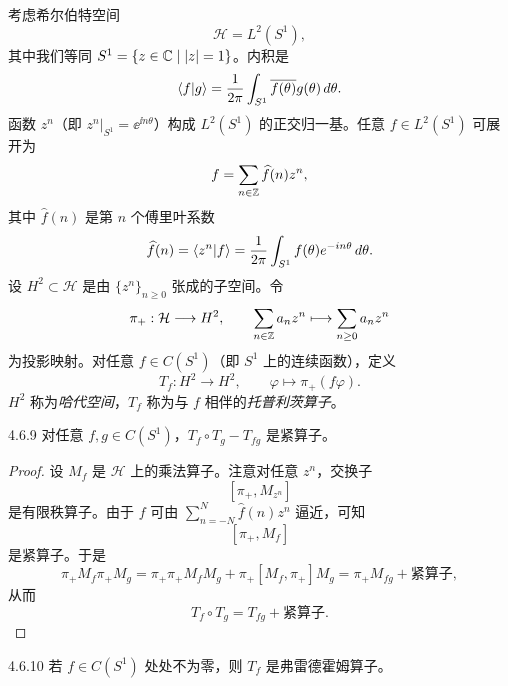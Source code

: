 考虑希尔伯特空间
\[
\mathcal{H}=L^2(S^1),
\]
其中我们等同 $S^1=\{z\in\mathbb{C}\mid\lvert z\rvert=1\}$。内积是
\[
\langle f|g\rangle=\frac{1}{2\pi}\int_{S^1}\overline{f(\theta)}g(\theta)\,d\theta.
\]
函数 $z^n$（即 $z^n|_{S^1}=\ee^{\ii n\theta}$）构成 $L^2(S^1)$ 的正交归一基。任意 $f\in L^2(S^1)$ 可展开为
\[
f=\sum_{n\in\mathbb{Z}}\widehat{f}(n)z^n,
\]
其中 $\widehat{f}(n)$ 是第 $n$ 个傅里叶系数
\[
\widehat{f}(n)=\langle z^n|f\rangle
=\frac{1}{2\pi}\int_{S^1}f(\theta)e^{-i n\theta}\,d\theta.
\]
设 $H^2\subset\mathcal{H}$ 是由 $\{z^n\}_{n\ge0}$ 张成的子空间。令
\[
\pi_+:\mathcal{H}\longrightarrow H^2,\qquad
\sum_{n\in\mathbb{Z}}a_nz^n\longmapsto\sum_{n\ge0}a_nz^n
\]
为投影映射。对任意 $f\in C(S^1)$（即 $S^1$ 上的连续函数），定义
\[
T_f:H^2\longrightarrow H^2,\qquad
\varphi\longmapsto\pi_+(f\varphi).
\]
$H^2$ 称为\emph{哈代空间}，$T_f$ 称为与 $f$ 相伴的\emph{托普利茨算子}。

\begin{lemma}{4.6.9}
  对任意 $f,g\in C(S^1)$，$T_f\circ T_g-T_{fg}$ 是紧算子。
\end{lemma}

\begin{proof}
  设 $M_f$ 是 $\mathcal{H}$ 上的乘法算子。注意对任意 $z^n$，交换子
  \[
  [\pi_+,M_{z^n}]
  \]
  是有限秩算子。由于 $f$ 可由 $\sum_{n=-N}^N\widehat{f}(n)z^n$ 逼近，可知
  \[
  [\pi_+,M_f]
  \]
  是紧算子。于是
  \[
  \pi_+M_f\pi_+M_g
  =\pi_+\pi_+M_fM_g+\pi_+[M_f,\pi_+]M_g
  =\pi_+M_{fg}+\text{紧算子},
  \]
  从而
  \[
  T_f\circ T_g=T_{fg}+\text{紧算子}.
  \]
\end{proof}

\begin{corollary}{4.6.10}
  若 $f\in C(S^1)$ 处处不为零，则 $T_f$ 是弗雷德霍姆算子。
\end{corollary}

